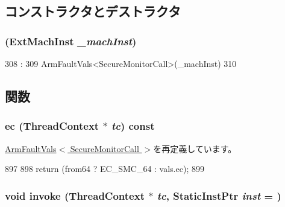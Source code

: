 \subsection{コンストラクタとデストラクタ}
\hypertarget{classArmISA_1_1SecureMonitorCall_aab4fff0747965a2d46f019a6acb71460}{
\subsubsection[{SecureMonitorCall}]{ (ExtMachInst {\em \_\-machInst})}}
\label{classArmISA_1_1SecureMonitorCall_aab4fff0747965a2d46f019a6acb71460}



\begin{DoxyCode}
308                                              :
309         ArmFaultVals<SecureMonitorCall>(_machInst)
310     {}

\end{DoxyCode}


\subsection{関数}
\hypertarget{classArmISA_1_1SecureMonitorCall_aefab73b22a74d7c48b8a23230906d7cd}{
\subsubsection[{ec}]{ ec ({\bf ThreadContext} $\ast$ {\em tc}) const}}
\label{classArmISA_1_1SecureMonitorCall_aefab73b22a74d7c48b8a23230906d7cd}


\hyperlink{classArmISA_1_1ArmFaultVals_aa4dd5fb47a1253dbe17e692e905a8c7c}{ArmFaultVals$<$ SecureMonitorCall $>$}を再定義しています。


\begin{DoxyCode}
897 {
898     return (from64 ? EC_SMC_64 : vals.ec);
899 }
\end{DoxyCode}
\hypertarget{classArmISA_1_1SecureMonitorCall_a2bd783b42262278d41157d428e1f8d6f}{
\subsubsection[{invoke}]{\setlength{\rightskip}{0pt plus 5cm}void invoke ({\bf ThreadContext} $\ast$ {\em tc}, \/  {\bf StaticInstPtr} {\em inst} = {})}}
\label{classArmISA_1_1SecureMonitorCall_a2bd783b42262278d41157d428e1f8d6f}


